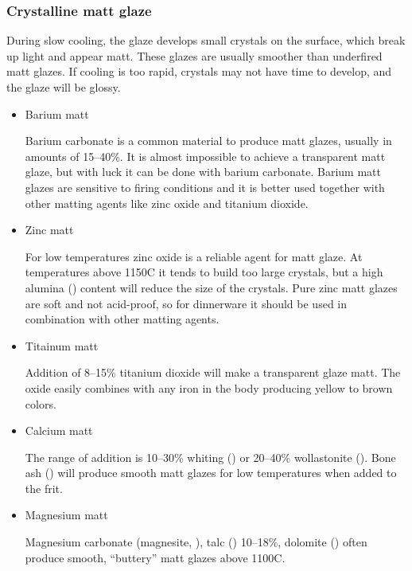 \subsubsection{Crystalline matt glaze}
During slow cooling, the glaze develops small crystals on the surface, which 
break up light and appear matt. These glazes are usually smoother than 
underfired matt glazes. If cooling is too rapid, crystals may not have time to 
develop, and the glaze will be glossy.
\begin{itemize}
\item Barium matt

Barium carbonate is a common material to produce matt glazes, usually in 
amounts of 15--40\%. It is almost impossible to achieve a transparent matt 
glaze, but with luck it can be done with barium carbonate. Barium matt glazes 
are sensitive to firing conditions and it is better used together with other 
matting agents like zinc oxide and titanium dioxide.

\item Zinc matt

For low temperatures zinc oxide is a reliable agent for matt glaze. At 
temperatures above 1150\degree C it tends to build too large crystals, but a 
high alumina () content will reduce the size of the crystals. Pure 
zinc matt glazes are soft and not acid-proof, so for dinnerware it should be 
used in combination with other matting agents.

\item Titainum matt

Addition of 8--15\% titanium dioxide will make a transparent glaze matt. The 
oxide easily combines with any iron in the body producing yellow to brown 
colors.

\item Calcium matt

The range of addition is 10--30\% whiting () or 20--40\% wollastonite 
(). Bone ash () will produce smooth matt glazes for 
low temperatures when added to the frit.

\item Magnesium matt

Magnesium carbonate (magnesite, ), talc () 
10--18\%, dolomite () often produce smooth, ``buttery'' matt 
glazes above 1100\degree C.
\end{itemize}


